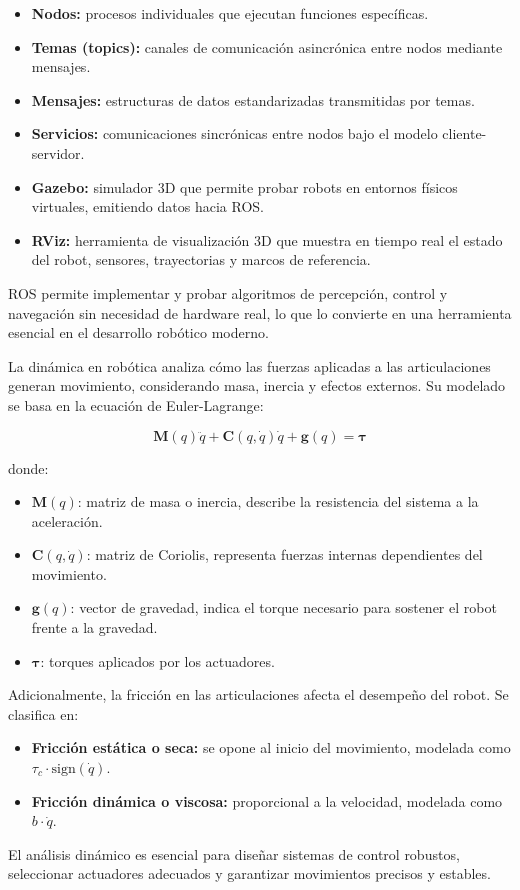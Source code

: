 \begin{itemize}
	\item \textbf{Nodos:} procesos individuales que ejecutan funciones específicas.
	\item \textbf{Temas (topics):} canales de comunicación asincrónica entre nodos mediante mensajes.
	\item \textbf{Mensajes:} estructuras de datos estandarizadas transmitidas por temas.
	\item \textbf{Servicios:} comunicaciones sincrónicas entre nodos bajo el modelo cliente-servidor.
	\item \textbf{Gazebo:} simulador 3D que permite probar robots en entornos físicos virtuales, emitiendo datos hacia ROS.
	\item \textbf{RViz:} herramienta de visualización 3D que muestra en tiempo real el estado del robot, sensores, trayectorias y marcos de referencia.
\end{itemize}

ROS permite implementar y probar algoritmos de percepción, control y navegación sin necesidad de hardware real, lo que lo convierte en una herramienta esencial en el desarrollo robótico moderno.


La dinámica en robótica analiza cómo las fuerzas aplicadas a las articulaciones generan movimiento, considerando masa, inercia y efectos externos. Su modelado se basa en la ecuación de Euler-Lagrange:

\begin{equation}
	\mathbf{M}(q)\ddot{q} + \mathbf{C}(q,\dot{q})\dot{q} + \mathbf{g}(q) = \boldsymbol{\tau}
\end{equation}

donde:

\begin{itemize}
	\item $\mathbf{M}(q)$: matriz de masa o inercia, describe la resistencia del sistema a la aceleración.
	\item $\mathbf{C}(q,\dot{q})$: matriz de Coriolis, representa fuerzas internas dependientes del movimiento.
	\item $\mathbf{g}(q)$: vector de gravedad, indica el torque necesario para sostener el robot frente a la gravedad.
	\item $\boldsymbol{\tau}$: torques aplicados por los actuadores.
\end{itemize}

Adicionalmente, la fricción en las articulaciones afecta el desempeño del robot. Se clasifica en:

\begin{itemize}
	\item \textbf{Fricción estática o seca:} se opone al inicio del movimiento, modelada como $\tau_c \cdot \text{sign}(\dot{q})$.
	\item \textbf{Fricción dinámica o viscosa:} proporcional a la velocidad, modelada como $b \cdot \dot{q}$.
\end{itemize}

El análisis dinámico es esencial para diseñar sistemas de control robustos, seleccionar actuadores adecuados y garantizar movimientos precisos y estables.

\newpage
